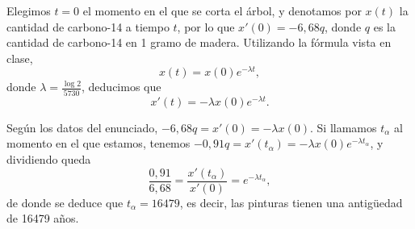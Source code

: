 \documentclass[../main.tex]{subfiles}
\begin{document}
\begin{solution}
    Elegimos \(t = 0\) el momento en el que se corta el árbol, y denotamos por
    \(x(t)\) la cantidad de carbono-14 a tiempo \(t\), por lo que
    \(x'(0) = -6,68 q\), donde \(q\) es la cantidad de carbono-14 en 1 gramo de
    madera.  Utilizando la fórmula vista en clase,
    \[x(t) = x(0) e^{-\lambda t},\]
    donde \(\lambda = \frac{\log 2}{5730}\), deducimos que
    \[x'(t) = -\lambda x(0) e^{-\lambda t}.\]

    Según los datos del enunciado, \(-6,68 q = x'(0) = -\lambda x(0)\). Si
    llamamos \(t_\alpha\) al momento en el que estamos, tenemos
    \(-0,91 q = x'(t_\alpha) = - \lambda x(0) e^{-\lambda t_\alpha}\), y
    dividiendo queda
    \[\frac{0,91}{6,68} = \frac{x'(t_\alpha)}{x'(0)} = e^{-\lambda t_\alpha},\]
    de donde se deduce que \(t_\alpha = 16479\), es decir, las pinturas tienen una
    antigüedad de 16479 años.
\end{solution}
\end{document}
